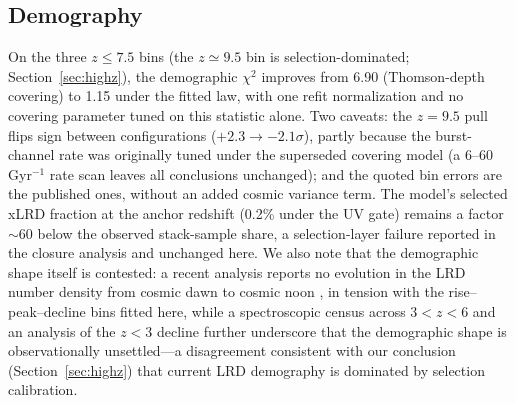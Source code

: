 \documentclass[twocolumn]{aastex631}
\begin{document}
\subsection{Demography}\label{sec:demog}
On the three $z\le7.5$ bins (the $z\simeq9.5$ bin is
selection-dominated; Section~\ref{sec:highz}), the demographic
$\chi^{2}$ improves from 6.90 (Thomson-depth covering) to 1.15 under the
fitted law, with one refit normalization and no covering parameter tuned
on this statistic alone. Two caveats: the $z=9.5$ pull flips sign between
configurations ($+2.3\rightarrow-2.1\sigma$), partly because the
burst-channel rate was originally tuned under the superseded covering
model (a 6--60 Gyr$^{-1}$ rate scan leaves all conclusions unchanged);
and the quoted bin errors are the published ones, without an added cosmic
variance term. The model's selected xLRD fraction at the anchor redshift
(0.2\% under the UV gate) remains a factor $\sim$60 below the observed
stack-sample share, a selection-layer failure reported in the closure
analysis and unchanged here. We also note that the demographic shape
itself is contested: a recent analysis reports no evolution in the LRD
number density from cosmic dawn to cosmic noon \citep{Loiacono2026}, in
tension with the rise--peak--decline bins fitted here, while a
spectroscopic census across $3<z<6$ \citep{Zhuang2025} and an analysis of
the $z<3$ decline \citep{Zhang2026} further underscore that the
demographic shape is observationally unsettled---a disagreement
consistent with our conclusion (Section~\ref{sec:highz}) that current
LRD demography is dominated by selection calibration.
\end{document}
